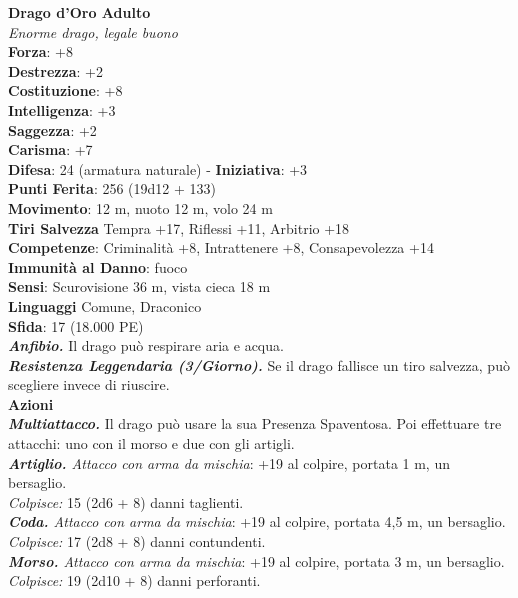 \begin{multicols}{2}
\medskip\textbf{Drago d'Oro Adulto}\\
\emph{Enorme drago, legale buono}\\
\textbf{Forza}: +8\\
\textbf{Destrezza}: +2\\
\textbf{Costituzione}: +8\\
\textbf{Intelligenza}: +3\\
\textbf{Saggezza}: +2\\
\textbf{Carisma}: +7\\
\textbf{Difesa}: 24 (armatura naturale) - \textbf{Iniziativa}: +3\\
\textbf{Punti Ferita}: 256 (19d12 + 133)\\
\textbf{Movimento}: 12 m, nuoto 12 m, volo 24 m\\
\textbf{Tiri Salvezza} Tempra +17, Riflessi +11, Arbitrio +18\\
\textbf{Competenze}: Criminalità +8, Intrattenere +8, Consapevolezza +14\\
\textbf{Immunità al Danno}: fuoco\\
\textbf{Sensi}: Scurovisione 36 m, vista cieca 18 m\\
\textbf{Linguaggi} Comune, Draconico\\
\textbf{Sfida}: 17 (18.000 PE)\smallskip\\
\emph{\textbf{Anfibio.}} Il drago può respirare aria e acqua.\\
\emph{\textbf{Resistenza Leggendaria (3/Giorno).}} Se il drago fallisce un tiro salvezza, può scegliere invece di riuscire.\\
\smallskip\textbf{Azioni}\\
\emph{\textbf{Multiattacco.}} Il drago può usare la sua Presenza Spaventosa. Poi effettuare tre attacchi: uno con il morso e due con gli artigli.\\
\emph{\textbf{Artiglio.} Attacco con arma da mischia}: +19 al colpire, portata 1 m, un bersaglio.\\
\emph{Colpisce:} 15 (2d6 + 8) danni taglienti.\\
\emph{\textbf{Coda.} Attacco con arma da mischia}: +19 al colpire, portata 4,5 m, un bersaglio.\\
\emph{Colpisce:} 17 (2d8 + 8) danni contundenti.\\
\emph{\textbf{Morso.} Attacco con arma da mischia}: +19 al colpire, portata 3 m, un bersaglio.\\
\emph{Colpisce:} 19 (2d10 + 8) danni perforanti.\\

\end{multicols}
